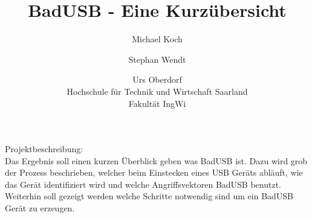 \documentclass[ a4paper, 12pt, ]{article}
\title{BadUSB - Eine Kurzübersicht}
\author{Michael Koch \and{Stephan Wendt} \and{Urs Oberdorf}\\Hochschule für Technik und Wirtschaft Saarland\\Fakultät IngWi}
\date{} %
\begin{document}
\maketitle
Projektbeschreibung:\\
Das Ergebnis soll einen kurzen Überblick geben was BadUSB ist. Dazu wird grob der Prozess beschrieben,
welcher beim Einstecken eines USB Geräts abläuft, wie das Gerät identifiziert wird und welche 
Angriffsvektoren BadUSB benutzt. Weiterhin soll gezeigt werden welche Schritte notwendig sind um ein
BadUSB Gerät zu erzeugen.
\end{document}
